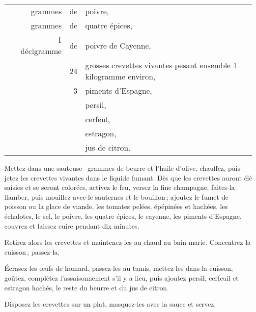 \begin{longtable}{rrrrp{16em}}
  &     & grammes & de & poivre,                                                                          \\
  &     & grammes & de & quatre épices,                                                                   \\
  & \multicolumn{2}{r}{1 décigramme}  & de & poivre de Cayenne,                                           \\
  &     &         & 24 & grosses crevettes vivantes pesant ensemble 1 kilogramme environ,                 \\
  &     &         &  3 & piments d'Espagne,                                                               \\
  &     &         &    & persil,                                                                          \\
  &     &         &    & cerfeul,                                                                         \\
  &     &         &    & estragon,                                                                        \\
  &     &         &    & jus de citron.                                                                   \\
\end{longtable}
\normalsize

\label{pg0287-2} \hypertarget{p0287-2}{}
Mettez dans une sauteuse {\mmm} grammes de beurre et l'huile d'olive,
chauffez, puis jetez les crevettes vivantes dans le liquide fumant. Dès que les
crevettes auront élé saisies et se seront colorées, activez le feu, versez la
fine champagne, faites-la flamber, puis mouillez avec le sauternes et le
bouillon ; ajoutez le fumet de poisson ou la glace de viande, les tomates
pelées, épépinées et hachées, les échalotes, le sel, le poivre, les quatre
épices, le cayenne, les piments d'Espagne, couvrez et laissez cuire pendant dix
minutes.

Retirez alors les crevettes et maintenez-les au chaud au bain-marie. Concentrez
la cuisson ; passez-la.

Écrasez les œufs de homard, passez-les au tamis, mettez-les dans la cuisson,
goûtez, complétez l'assaisonnement s'il y a lieu, puis ajoutez persil, cerfeuil
et estragon hachés, le reste du beurre et du jus de citron.

Disposez les crevettes sur un plat, masquez-les avec la sauce et servez.

\sk

